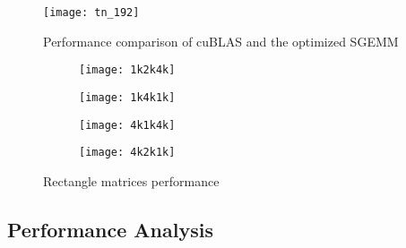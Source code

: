 \begin{figure}[htbp]
\begin{center}
\texttt{[image: tn\_192]}
\caption{Performance comparison of cuBLAS and the optimized SGEMM }
\label{fig:sgemm_tn}
\end{center}
\end{figure}


\begin{figure*}
    \begin{subfigure}[htbp]{0.5\textwidth}
        \texttt{[image: 1k2k4k]}
        \label{fig:1k2k4k}
    \end{subfigure}
    \begin{subfigure}[htbp]{0.5\textwidth}
\begin{center}
        \texttt{[image: 1k4k1k]}
\end{center}
        \label{fig:1k4k1k}
    \end{subfigure}
    \begin{subfigure}[htbp]{0.5\textwidth}
        \texttt{[image: 4k1k4k]}
        \label{fig:4k1k4k}
    \end{subfigure}
    \begin{subfigure}[htbp]{0.5\textwidth}
        \texttt{[image: 4k2k1k]}
        \label{fig:4k2k1k}
    \end{subfigure}
    \caption{Rectangle matrices performance}
    \label{fig:rectangle}
\end{figure*}

\subsection{Performance Analysis}

